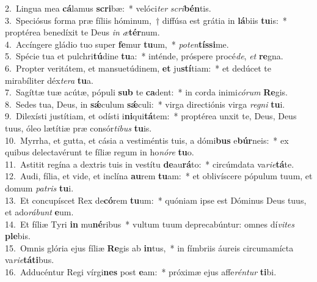 {2.~}Lingua mea \textbf{cá}lamus \textbf{scri}bæ:~* velóci\textit{ter} \textit{scri}\textbf{bén}tis.\\
{3.~}Speciósus forma præ fíliis hóminum,~† diffúsa est grátia in \textbf{lá}biis \textbf{tu}is:~* proptérea benedíxit te Deus \textit{in} \textit{æ}\textbf{tér}num.\\
{4.~}Accíngere gládio tuo super \textbf{fe}mur \textbf{tu}um,~* \textit{po}\textit{ten}\textbf{tís}\textbf{si}me.\\
{5.~}Spécie tua et pulchri\textbf{tú}dine \textbf{tu}a:~* inténde, próspere procé\textit{de}, \textit{et} \textbf{re}gna.\\
{6.~}Propter veritátem, et mansuetúdinem, \textbf{et} ju\textbf{stí}tiam:~* et dedúcet te mirabíliter déx\textit{te}\textit{ra} \textbf{tu}a.\\
{7.~}Sagíttæ tuæ acútæ, pópuli \textbf{sub} te \textbf{ca}dent:~* in corda inimi\textit{có}\textit{rum} \textbf{Re}gis.\\
{8.~}Sedes tua, Deus, in \textbf{sǽ}culum \textbf{sǽ}culi:~* virga directiónis virga \textit{re}\textit{gni} \textbf{tu}i.\\
{9.~}Dilexísti justítiam, et odísti i\textbf{ni}qui\textbf{tá}tem:~* proptérea unxit te, Deus, Deus tuus, óleo lætítiæ præ consór\textit{ti}\textit{bus} \textbf{tu}is.\\
{10.~}Myrrha, et gutta, et cásia a vestiméntis tuis, a dómi\textbf{bus} e\textbf{búr}neis:~* ex quibus delectavérunt te fíliæ regum in ho\textit{nó}\textit{re} \textbf{tu}o.\\
{11.~}Astitit regína a dextris tuis in vestítu \textbf{de}au\textbf{rá}to:~* circúmdata va\textit{ri}\textit{e}\textbf{tá}te.\\
{12.~}Audi, fília, et vide, et inclína \textbf{au}rem \textbf{tu}am:~* et oblivíscere pópulum tuum, et domum \textit{pa}\textit{tris} \textbf{tu}i.\\
{13.~}Et concupíscet Rex de\textbf{có}rem \textbf{tu}um:~* quóniam ipse est Dóminus Deus tuus, et ado\textit{rá}\textit{bunt} \textbf{e}um.\\
{14.~}Et fíliæ Tyri \textbf{in} mu\textbf{né}ribus~* vultum tuum deprecabúntur: omnes dí\textit{vi}\textit{tes} \textbf{ple}bis.\\
{15.~}Omnis glória ejus fíliæ \textbf{Re}gis ab \textbf{in}tus,~* in fímbriis áureis circumamícta va\textit{ri}\textit{e}\textbf{tá}\textbf{ti}bus.\\
{16.~}Adducéntur Regi vírgi\textbf{nes} post \textbf{e}am:~* próximæ ejus affe\textit{rén}\textit{tur} \textbf{ti}bi.\\
